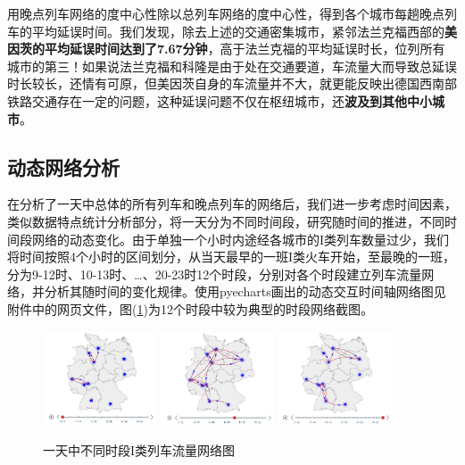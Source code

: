 \documentclass[lang=cn,12pt,a4paper,cite=authoryear]{elegantpaper}
\begin{document}
用晚点列车网络的度中心性除以总列车网络的度中心性，得到各个城市每趟晚点列车的平均延误时间。我们发现，除去上述的交通密集城市，紧邻法兰克福西部的\textbf{美因茨的平均延误时间达到了7.67分钟}，高于法兰克福的平均延误时长，位列所有城市的第三！如果说法兰克福和科隆是由于处在交通要道，车流量大而导致总延误时长较长，还情有可原，但美因茨自身的车流量并不大，就更能反映出德国西南部铁路交通存在一定的问题，这种延误问题不仅在枢纽城市，还\textbf{波及到其他中小城市}。


\subsection{动态网络分析}

在分析了一天中总体的所有列车和晚点列车的网络后，我们进一步考虑时间因素，类似数据特点统计分析部分，将一天分为不同时间段，研究随时间的推进，不同时间段网络的动态变化。由于单独一个小时内途经各城市的I类列车数量过少，我们将时间按照4个小时的区间划分，从当天最早的一班I类火车开始，至最晚的一班，分为9-12时、10-13时、…、20-23时12个时段，分别对各个时段建立列车流量网络，并分析其随时间的变化规律。使用pyecharts画出的动态交互时间轴网络图见附件中的网页文件，图(\ref{fig11})为12个时段中较为典型的时段网络截图。

\begin{figure}[H]
	\centering
	\includegraphics[width=0.3\textwidth]{image/graph31.png}
	\includegraphics[width=0.3\textwidth]{image/graph32.png}
	\includegraphics[width=0.3\textwidth]{image/graph33.png}
	\caption{一天中不同时段I类列车流量网络图}
	\label{fig11}
\end{figure}
\end{document}

